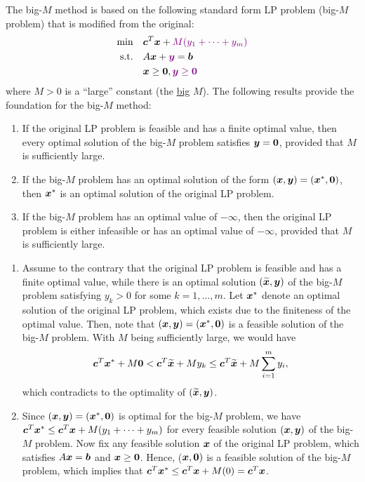 \begin{enumerate}
The big-\(M\) method is based on the following standard form LP problem
(big-\(M\) problem) that is modified from the original:
\begin{align*}
\text{min}\quad&\vect{c}^{T}\vect{x}+\vc{M(y_1+\dotsb+y_m)} \\
\text{s.t.}\quad&A\vect{x}+\vc{\vect{y}}=\vect{b} \\
&\vect{x}\ge \vect{0},\vc{\vect{y}\ge\vect{0}}
\end{align*}
where \(M>0\) is a ``large'' constant (the \underline{big} \(M\)). The
following results provide the foundation for the big-\(M\) method:
\begin{enumerate}
\item\label{it:big-m-y-zero} If the original LP problem is feasible and has a finite optimal value,
then every optimal solution of the big-\(M\) problem satisfies
\(\bm{y}=\bm{0}\), provided that \(M\) is sufficiently large.
\item\label{it:big-m-get-optim} If the big-\(M\) problem has an optimal solution of the form
\((\bm{x},\bm{y})=(\bm{x}^{*},\bm{0})\), then \(\bm{x}^*\) is an
optimal solution of the original LP problem.
\item \label{it:big-m-neg-inf} If the big-\(M\) problem has an optimal value of
\(-\infty\), then the original LP problem is either infeasible or has an optimal
value of \(-\infty\), provided that \(M\) is sufficiently large.
\end{enumerate}
\begin{pf}
\begin{enumerate}
\item Assume to the contrary that the original LP problem is feasible and has a
finite optimal value, while there is an optimal solution
\((\widetilde{\bm{x}},\bm{y})\) of the big-\(M\) problem satisfying
\(y_k>0\) for some \(k=1,\dotsc,m\). Let \(\bm{x}^*\) denote an optimal
solution of the original LP problem, which exists due to the finiteness of the
optimal value. Then, note that \((\bm{x},\bm{y})=(\bm{x}^*,\bm{0})\) is
a feasible solution of the big-\(M\) problem. With \(M\) being sufficiently
large, we would have
\[
\bm{c}^{T}\bm{x}^{*}+M\bm{0}<\bm{c}^{T}\widetilde{\bm{x}}+My_k\le\bm{c}^{T}\widetilde{\bm{x}}+M\sum_{i=1}^{m}y_i,
\]
which contradicts to the optimality of \((\widetilde{\bm{x}},\bm{y})\).
\item Since \((\bm{x},\bm{y})=(\bm{x}^{*},\bm{0})\) is optimal for the
big-\(M\) problem, we have \(\bm{c}^{T}\bm{x}^*\le
\bm{c}^{T}\bm{x}+M(y_1+\dotsb+y_m)\) for every feasible solution
\((\bm{x},\bm{y})\) of the big-\(M\) problem. Now fix any feasible solution
\(\bm{x}\) of the original LP problem, which satisfies \(A\bm{x}=\bm{b}\)
and \(\bm{x}\ge\bm{0}\). Hence, (\(\bm{x},\bm{0})\) is a feasible
solution of the big-\(M\) problem, which implies that
\(\bm{c}^{T}\bm{x}^{*}\le\bm{c}^{T}\bm{x}+M(0)=\bm{c}^{T}\bm{x}\).


\end{enumerate}
\end{pf}
\end{enumerate}
